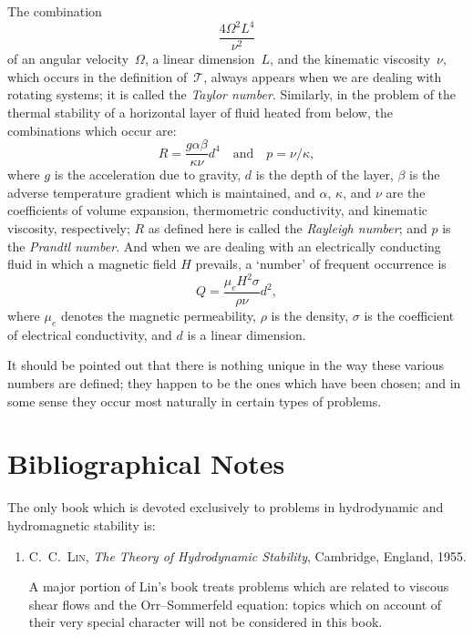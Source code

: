 The combination
\begin{equation}
\label{eq:1-13}
\frac{4\Omega^2 L^4}{\nu^2}
\end{equation}
of an angular velocity~$\Omega$, a linear dimension~$L$, and the kinematic
viscosity~$\nu$, which occurs in the definition of~$\mathscr{T}$, always appears when we
are dealing with rotating systems; it is called the \emph{Taylor number}.
Similarly, in the problem of the thermal stability of a horizontal layer
of fluid heated from below, the combinations which occur are:
\begin{equation}
\label{eq:1-14}
R = \frac{g\alpha\beta}{\kappa\nu}d^4 \quad\text{and}\quad p = \nu/\kappa,
\end{equation}
where $g$ is the acceleration due to gravity, $d$ is the depth of the layer,
$\beta$ is the adverse temperature gradient which is maintained, and
$\alpha$, $\kappa$, and $\nu$ are the coefficients of volume expansion, thermometric
conductivity, and kinematic viscosity, respectively; $R$ as defined here
is called the \emph{Rayleigh number}; and $p$ is the \emph{Prandtl number}.  And when
we are dealing with an electrically conducting fluid in which a magnetic
field $H$ prevails, a `number' of frequent occurrence is
\begin{equation}
\label{eq:1-15}
Q = \frac{\mu_e H^2 \sigma}{\rho\nu}d^2,
\end{equation}
where $\mu_e$ denotes the magnetic permeability, $\rho$ is the density, $\sigma$ is the
coefficient of electrical conductivity, and $d$ is a linear dimension.

It should be pointed out that there is nothing unique in the way these
various numbers are defined; they happen to be the ones which have been
chosen; and in some sense they occur most naturally in certain types of
problems.

\section*{Bibliographical Notes}
\label{sec:1-bib}

The only book which is devoted exclusively to problems in hydrodynamic and
hydromagnetic stability is:

\begin{enumerate}
\item C.~C.~\textsc{Lin}, \emph{The Theory of Hydrodynamic Stability}, Cambridge, England, 1955.

A major portion of Lin's book treats problems which are related to viscous shear
flows and the Orr--Sommerfeld equation: topics which on account of their very
special character will not be considered in this book.
\end{enumerate}

